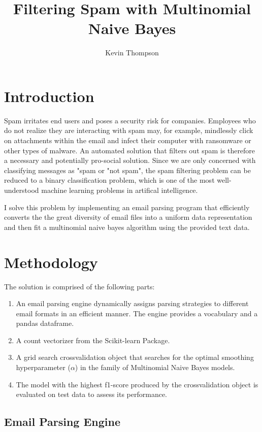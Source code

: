 \documentclass[10pt,a4paper]{article}
\author{Kevin Thompson}
\title{Filtering Spam with Multinomial Naive Bayes}
\begin{document}
\maketitle



\section{Introduction}
Spam irritates end users and poses a security risk for companies. Employees who do not realize they are interacting with spam may, for example, mindlessly click on attachments within the email and infect their computer with ransomware or other types of malware. An automated solution that filters out spam is therefore a necessary and potentially pro-social solution. Since we are only concerned with classifying messages as "spam or "not spam", the spam filtering problem can be reduced to a binary classification problem, which is one of the most well-understood machine learning problems in artifical intelligence.

I solve this problem by implementing an email parsing program that efficiently converts the the great diversity of email files into a uniform data representation and then fit a multinomial naive bayes algorithm using the provided text data.

\section{Methodology}
The solution is comprised of the following parts:
\begin{enumerate}
\item An email parsing engine dynamically assigns parsing strategies to different email formats in an efficient manner. The engine provides a vocabulary and a pandas dataframe.
\item A count vectorizer from the Scikit-learn Package.
\item A grid search crossvalidation object that searches for the optimal smoothing hyperparameter ($\alpha$) in the family of Multinomial Naive Bayes models.
\item The model with the highest f1-score produced by the crossvalidation object is evaluated on test data to assess its performance.
\end{enumerate}

\subsection{Email Parsing Engine}
\end{document}
